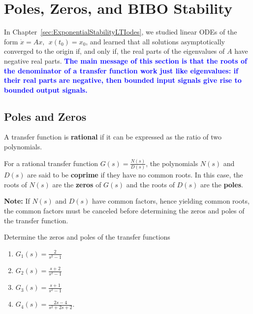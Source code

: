 \vspace*{.2cm}

\section{Poles, Zeros, and BIBO Stability}
\label{sec:PolesBIBO}

In Chapter~\ref{sec:ExponentialStabilityLTIodes}, we studied linear ODEs of the form $\dot{x} = Ax, ~~x(t_0) = x_0$, and learned that all solutions asymptotically converged to the origin if, and only if, the real parts of the eigenvalues of $A$ have negative real parts. \textcolor{blue}{\bf The main message of this section is that the roots of the denominator of a transfer function work just like eigenvalues: if their real parts are negative, then bounded input signals give rise to bounded output signals.} 

\subsection{Poles and Zeros}
A transfer function is {\bf rational} if it can be expressed as the ratio of two polynomials. 


\vspace*{.2cm}

\begin{tcolorbox}[colback=mylightblue, title = {\bf Poles and Zeros}, breakable]

\begin{definition} 
\label{def:PolesZeros}
For a rational transfer function $G(s)=\frac{N(s)}{D(s)}$, the polynomials $N(s)$ and $D(s)$ are said to be \textbf{coprime} if they have no common roots. In this case, the roots of $N(s)$ are the \textbf{zeros} of $G(s)$ and the roots of $D(s)$ are the \textbf{poles}. 

\end{definition}

\textbf{Note:} If $N(s)$ and $D(s)$ have common factors, hence yielding common roots, the common factors must be canceled before determining the zeros and poles of the transfer function.
\end{tcolorbox}

\vspace*{.2cm}


\begin{example}
\label{ex:OLPolesZeros}
Determine the zeros and poles of the transfer functions 
 \begin{enumerate}
\renewcommand{\labelenumi}{(\alph{enumi})}
\setlength{\itemsep}{.2cm}
\item $G_1(s) = \frac{2}{s^2-1}$

\item $G_2(s) = \frac{s+2}{s^2-1}$ 

\item $G_3(s) = \frac{s+1}{s^2-1}$

\item $G_4(s) = \frac{2s-4}{s^2+2s+2}$.
\end{enumerate}
\end{example}

